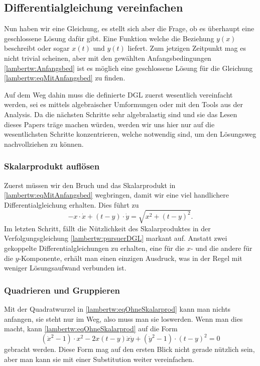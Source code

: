 \subsection{Differentialgleichung vereinfachen
	\label{lambertw:subsection:DGLvereinfach}}
Nun haben wir eine Gleichung, es stellt sich aber die Frage, ob es überhaupt eine geschlossene Lösung dafür gibt. Eine Funktion welche die Beziehung \(y(x)\) beschreibt oder sogar \(x(t)\) und \(y(t)\) liefert. Zum jetzigen Zeitpunkt mag es nicht trivial scheinen, aber mit den gewählten Anfangsbedingungen \eqref{lambertw:Anfangsbed} ist es möglich eine geschlossene Lösung für die Gleichung \eqref{lambertw:eqMitAnfangsbed} zu finden.

Auf dem Weg dahin muss die definierte DGL zuerst wesentlich vereinfacht werden, sei es mittels algebraischer Umformungen oder mit den Tools aus der Analysis. Da die nächsten Schritte sehr algebralastig sind und sie das Lesen dieses Papers träge machen würden, werden wir uns hier nur auf die wesentlichsten Schritte konzentrieren, welche notwendig sind, um den Lösungsweg nachvollziehen zu können.

\subsubsection{Skalarprodukt auflösen
	\label{lambertw:subsubsection:SkalProdAufl}}
Zuerst müssen wir den Bruch und das Skalarprodukt in \eqref{lambertw:eqMitAnfangsbed} wegbringen, damit wir eine viel handlichere Differentialgleichung erhalten. Dies führt zu
\begin{equation}
		-x \cdot \dot{x} + (t-y) \cdot \dot{y}
		= \sqrt{x^2 + (t-y)^2}.
		\label{lambertw:eqOhneSkalarprod}
\end{equation}
Im letzten Schritt, fällt die Nützlichkeit des Skalarproduktes in der Verfolgungsgleichung \eqref{lambertw:pursuerDGL} markant auf. Anstatt zwei gekoppelte Differentialgleichungen zu erhalten, eine für die \(x\)- und die andere für die \(y\)-Komponente, erhält man einen einzigen Ausdruck, was in der Regel mit weniger Lösungsaufwand verbunden ist.

\subsubsection{Quadrieren und Gruppieren
	\label{lambertw:subsubsection:QuadUndGrup}}
Mit der Quadratwurzel in \eqref{lambertw:eqOhneSkalarprod} kann man nichts anfangen, sie steht nur im Weg, also muss man sie loswerden. Wenn man dies macht, kann \eqref{lambertw:eqOhneSkalarprod} auf die Form  
\begin{equation}
	\left(\dot{x}^2-1\right) \cdot x^2 -2x \left(t-y\right) \dot{x}\dot{y} + \left(\dot{y}^2-1\right) \cdot \left(t-y\right)^2
	=0
	\label{lambertw:eqOhneWurzel}
\end{equation}
gebracht werden.
Diese Form mag auf den ersten Blick nicht gerade nützlich sein, aber man kann sie mit einer Substitution weiter vereinfachen.

